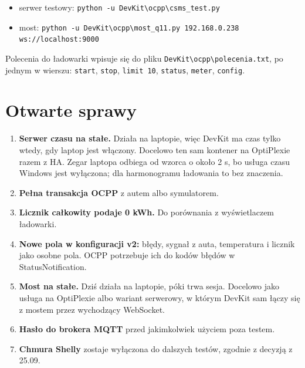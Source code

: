 \documentclass[11pt,a4paper]{article}
\begin{document}
\begin{itemize}
\item serwer testowy: \texttt{python -\allowbreak{}u DevKit\textbackslash{}ocpp\textbackslash{}csms\_\allowbreak{}test.\allowbreak{}py}
\item most: \texttt{python -\allowbreak{}u DevKit\textbackslash{}ocpp\textbackslash{}most\_\allowbreak{}q11.\allowbreak{}py 192.\allowbreak{}168.\allowbreak{}0.\allowbreak{}238 ws:\allowbreak{}/\allowbreak{}/\allowbreak{}localhost:\allowbreak{}9000}
\end{itemize}

Polecenia do ładowarki wpisuje się do pliku \texttt{DevKit\textbackslash{}ocpp\textbackslash{}polecenia.\allowbreak{}txt}, po jednym w wierszu: \texttt{start}, \texttt{stop}, \texttt{limit 10}, \texttt{status}, \texttt{meter}, \texttt{config}.


\section{Otwarte sprawy}

\begin{enumerate}
\item \textbf{Serwer czasu na stałe.} Działa na laptopie, więc DevKit ma czas tylko wtedy, gdy laptop jest włączony. Docelowo ten sam kontener na OptiPlexie razem z HA. Zegar laptopa odbiega od wzorca o około 2 s, bo usługa czasu Windows jest wyłączona; dla harmonogramu ładowania to bez znaczenia.
\item \textbf{Pełna transakcja OCPP} z autem albo symulatorem.
\item \textbf{Licznik całkowity podaje 0 kWh.} Do porównania z wyświetlaczem ładowarki.
\item \textbf{Nowe pola w konfiguracji v2:} błędy, sygnał z auta, temperatura i licznik jako osobne pola. OCPP potrzebuje ich do kodów błędów w StatusNotification.
\item \textbf{Most na stałe.} Dziś działa na laptopie, póki trwa sesja. Docelowo jako usługa na OptiPlexie albo wariant serwerowy, w którym DevKit sam łączy się z mostem przez wychodzący WebSocket.
\item \textbf{Hasło do brokera MQTT} przed jakimkolwiek użyciem poza testem.
\item \textbf{Chmura Shelly} zostaje wyłączona do dalszych testów, zgodnie z decyzją z 25.09.
\end{enumerate}
\end{document}
